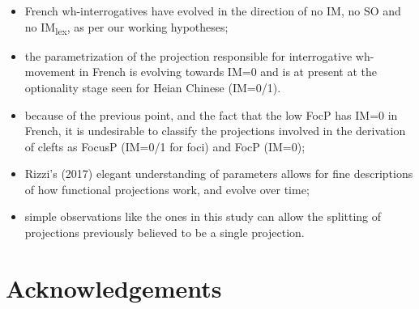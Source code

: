 \documentclass[fleqn,10pt]{wlscirep}
\begin{document}
\begin{itemize}
\item[\ding{227}] French wh-interrogatives have evolved in the direction of no IM, no SO and no IM\textsubscript{lex}, as per our working hypotheses;
\item[\ding{227}] \vspace*{-2mm} the parametrization of the projection responsible for interrogative wh-movement in French is evolving towards IM=0 and is at present at the optionality stage seen for Heian Chinese (IM=0/1).
\item[\ding{227}] \vspace*{-2mm} because of the previous point, and the fact that the low FocP has IM=0 in French, it is undesirable to classify the projections involved in the derivation of clefts as FocusP (IM=0/1 for foci) and FocP (IM=0);
\item[\ding{227}] \vspace*{-2mm} Rizzi's (2017) elegant understanding of parameters allows for fine descriptions of how functional projections work, and evolve over time;
\item[\ding{227}] \vspace*{-2mm} simple observations like the ones in this study can allow the splitting of projections previously believed to be a single projection.
\end{itemize}




\section*{Acknowledgements}
\end{document}
